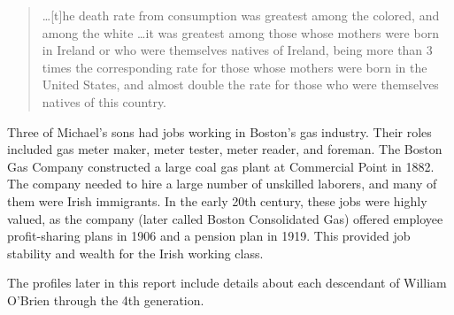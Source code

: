 \begin{quote}
	\ldots[t]he death rate from consumption was greatest among the colored, and among the white \ldots it was greatest among those whose mothers were born in Ireland or who were themselves natives of Ireland, being more than 3 times the corresponding rate for those whose mothers were born in the United States, and almost double the rate for those who were themselves natives of this country.\cite{VitalStatistics}
\end{quote}

Three of Michael's sons had jobs working in Boston's gas industry. Their roles included gas meter maker, meter tester, meter reader, and foreman. The Boston Gas Company constructed a large coal gas plant at Commercial Point in 1882. The company needed to hire a large number of unskilled laborers, and many of them were Irish immigrants.\cite{Keating:11} In the early 20th century, these jobs were highly valued, as the company (later called Boston Consolidated Gas) offered employee profit-sharing plans in 1906 and a pension plan in 1919. This provided job stability and wealth for the Irish working class.\cite{Keating:20}

The profiles later in this report include details about each descendant of William O'Brien through the 4th generation.
